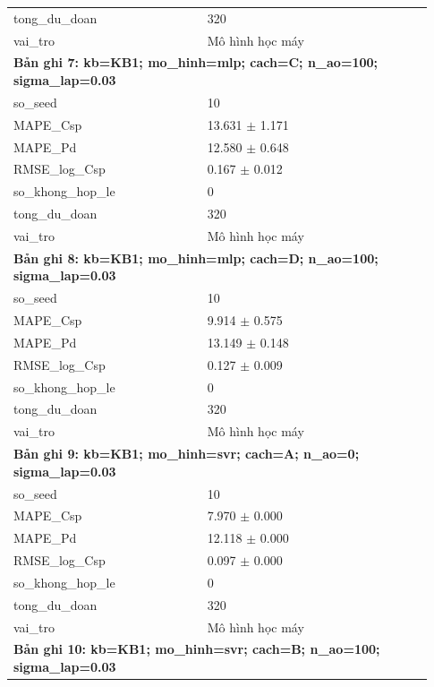 \begin{longtable}{p{0.43\linewidth}p{0.50\linewidth}}
tong\_\allowbreak du\_\allowbreak doan & 320 \\
vai\_\allowbreak tro & Mô hình học máy \\
\midrule
\multicolumn{2}{p{0.95\linewidth}}{\textbf{Bản ghi 7: kb=KB1; mo\_hinh=mlp; cach=C; n\_ao=100; sigma\_lap=0.03}} \\
so\_\allowbreak seed & 10 \\
MAPE\_\allowbreak Csp & 13.631 $\pm$ 1.171 \\
MAPE\_\allowbreak Pd & 12.580 $\pm$ 0.648 \\
RMSE\_\allowbreak log\_\allowbreak Csp & 0.167 $\pm$ 0.012 \\
so\_\allowbreak khong\_\allowbreak hop\_\allowbreak le & 0 \\
tong\_\allowbreak du\_\allowbreak doan & 320 \\
vai\_\allowbreak tro & Mô hình học máy \\
\midrule
\multicolumn{2}{p{0.95\linewidth}}{\textbf{Bản ghi 8: kb=KB1; mo\_hinh=mlp; cach=D; n\_ao=100; sigma\_lap=0.03}} \\
so\_\allowbreak seed & 10 \\
MAPE\_\allowbreak Csp & 9.914 $\pm$ 0.575 \\
MAPE\_\allowbreak Pd & 13.149 $\pm$ 0.148 \\
RMSE\_\allowbreak log\_\allowbreak Csp & 0.127 $\pm$ 0.009 \\
so\_\allowbreak khong\_\allowbreak hop\_\allowbreak le & 0 \\
tong\_\allowbreak du\_\allowbreak doan & 320 \\
vai\_\allowbreak tro & Mô hình học máy \\
\midrule
\multicolumn{2}{p{0.95\linewidth}}{\textbf{Bản ghi 9: kb=KB1; mo\_hinh=svr; cach=A; n\_ao=0; sigma\_lap=0.03}} \\
so\_\allowbreak seed & 10 \\
MAPE\_\allowbreak Csp & 7.970 $\pm$ 0.000 \\
MAPE\_\allowbreak Pd & 12.118 $\pm$ 0.000 \\
RMSE\_\allowbreak log\_\allowbreak Csp & 0.097 $\pm$ 0.000 \\
so\_\allowbreak khong\_\allowbreak hop\_\allowbreak le & 0 \\
tong\_\allowbreak du\_\allowbreak doan & 320 \\
vai\_\allowbreak tro & Mô hình học máy \\
\midrule
\multicolumn{2}{p{0.95\linewidth}}{\textbf{Bản ghi 10: kb=KB1; mo\_hinh=svr; cach=B; n\_ao=100; sigma\_lap=0.03}} \\

\end{longtable}
